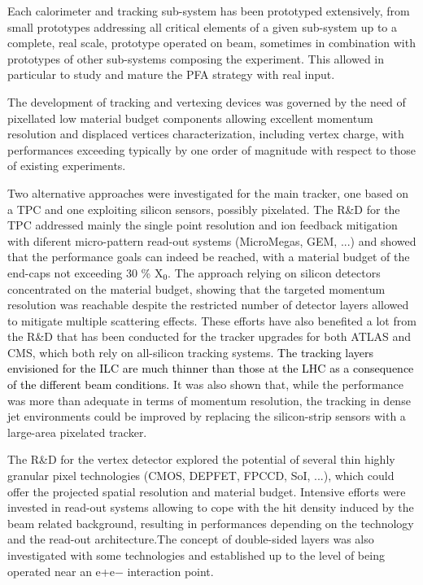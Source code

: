 \documentclass[%
 reprint,
 amsmath,amssymb,
 aps,
]{revtex4-1}
\newcommand{\jim}[1]{\textcolor{black}{#1}}
\begin{document}
Each calorimeter and tracking sub-system has been prototyped extensively, from small prototypes addressing all critical elements of a given sub-system up to a complete, real scale, prototype operated on beam, sometimes in combination with prototypes of other sub-systems composing the experiment. This allowed in particular to study and mature the PFA strategy with real input.

The development of tracking and vertexing devices was governed by the need of pixellated low material budget components allowing excellent momentum resolution and displaced vertices characterization, including vertex charge, with performances exceeding typically by one order of magnitude with respect to those of existing experiments.

Two alternative approaches were investigated for the main tracker, one based on a TPC and one exploiting silicon sensors, possibly pixelated. The R\&D for the TPC addressed mainly the single point resolution and ion feedback mitigation with diferent micro-pattern read-out systems (MicroMegas, GEM, ...) and showed that the performance goals can indeed be reached, with a material budget of the end-caps not exceeding 30 \% X\jim{$_0$}. The approach relying on silicon detectors concentrated on the material budget, showing that the targeted momentum resolution was reachable despite the restricted number of detector layers allowed to mitigate multiple scattering effects. These efforts have also benefited a lot from the R\&D that has been conducted for the tracker upgrades for both ATLAS and CMS, which both rely on all-silicon tracking systems. 
\jim{The tracking layers 
envisioned for the ILC are much thinner than those at the LHC as a consequence of the different beam conditions.}
It was also shown that, while the performance was more than adequate in terms of momentum resolution, the tracking in dense jet environments could be improved by replacing the silicon-strip sensors with a large-area pixelated tracker. 

The R\&D for the vertex detector explored the potential of several thin highly granular pixel technologies (CMOS, DEPFET, FPCCD, SoI, ...), which could offer the projected spatial resolution and material budget. Intensive efforts were invested in read-out systems allowing to cope with the hit density induced by the beam related background, resulting in performances depending on the technology and the read-out architecture.The concept of double-sided layers was also investigated with some technologies and established up to the level of being operated near an e+e− interaction point.
\end{document}
